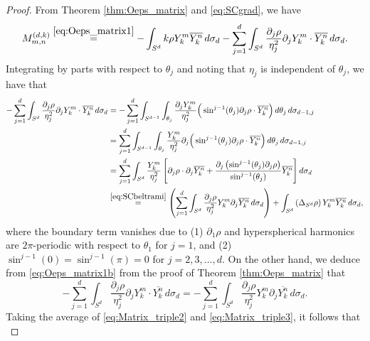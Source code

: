 \documentclass[11pt]{amsart}
\theoremstyle{definition}
\theoremstyle{plain}
\theoremstyle{remark}
\newcommand{\del}{\partial}
\newcommand{\cc}{\overline}
\begin{document}
\begin{proof} 
From Theorem \ref{thm:Oeps_matrix} and \eqref{eq:SCgrad}, we have 
\begin{equation} \label{eq:Matrix_triple1} 
M_{m, n}^{(d, k)} \stackrel{\eqref{eq:Oeps_matrix1}}{=} -\int_{S^d} k\rho Y_k^m\cc{Y_k^n}\, d\sigma_d - \sum_{j = 1}^d\int_{S^d} \frac{\del_j\rho}{\eta_j^2}\del_jY_k^m\cdot \cc{Y_k^n}\, d\sigma_d. 
\end{equation}  
Integrating by parts with respect to $\theta_j$ and noting that $\eta_j$ is independent of $\theta_j$, we have that 
\begin{gather} 
\begin{aligned} \label{eq:Matrix_triple2}
-\sum_{j = 1}^d \int_{S^d} \frac{\del_j\rho}{\eta_j^2}\del_jY_k^m\cdot \cc{Y_k^n}\, d\sigma_d & = -\sum_{j = 1}^d \int_{S^{d - 1}}\int_{\theta_j} \frac{\del_jY_k^m}{\eta_j^2}\Big(\sin^{j- 1}(\theta_j)\del_j\rho\cdot \cc{Y_k^n}\Big)\, d\theta_j\, d\sigma_{d - 1, j} \\ 
& = \sum_{j = 1}^d \int_{S^{d - 1}}\int_{\theta_j} \frac{Y_k^m}{\eta_j^2}\del_j\Big(\sin^{j- 1}(\theta_j)\del_j\rho\cdot \cc{Y_k^n}\Big)\, d\theta_j\, d\sigma_{d - 1, j} \\ 
& = \sum_{j = 1}^d \int_{S^d} \frac{Y_k^m}{\eta_j^2}\left[\del_j\rho\cdot\del_j\cc{Y_k^n} + \frac{\del_j\left(\sin^{j - 1}(\theta_j)\del_j\rho\right)}{\sin^{j - 1}(\theta_j)}\cc{Y_k^n}\right] d\sigma_d \\ 
& \stackrel{\eqref{eq:SCbeltrami}}{=} \left(\sum_{j = 1}^d\int_{S^d} \frac{\del_j\rho}{\eta_j^2} Y_k^m\del_j\cc{Y_k^n}\, d\sigma_d\right) + \int_{S^d} \left(\Delta_{S^d}\rho\right) Y_k^m\cc{Y_k^n}\, d\sigma_d, 
\end{aligned} 
\end{gather} 
where the boundary term vanishes due to (1) $\del_1\rho$ and hyperspherical harmonics are $2\pi$-periodic with respect to $\theta_1$ for $j = 1$, and (2) $\sin^{j - 1}(0) = \sin^{j - 1}(\pi) = 0$ for $j = 2, 3, \dots, d$. On the other hand, we deduce from \eqref{eq:Oeps_matrix1b} from the proof of Theorem \ref{thm:Oeps_matrix} that 
\begin{equation} \label{eq:Matrix_triple3} 
-\sum_{j = 1}^d \int_{S^d} \frac{\del_j\rho}{\eta_j^2}\del_jY_k^m\cdot \cc{Y_k^n}\, d\sigma_d = -\sum_{j = 1}^d\int_{S^d} \frac{\del_j\rho}{\eta_j^2} Y_k^m\del_j\cc{Y_k^n}\, d\sigma_d. 
\end{equation} 
Taking the average of \eqref{eq:Matrix_triple2} and \eqref{eq:Matrix_triple3}, it follows that 
\begin{equation} \label{eq:Matrix_triple4}

\end{equation}
\end{proof}
\end{document}
